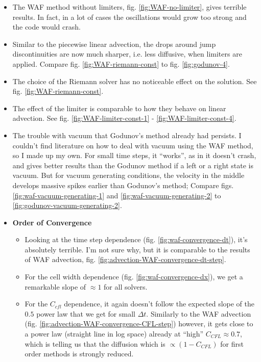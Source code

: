\begin{itemize}

	\item 	The WAF method without limiters, fig. \ref{fig:WAF-no-limiter}, gives terrible results.
			In fact, in a lot of cases the oscillations would grow too strong and the code would crash.

	\item 	Similar to the piecewise linear advection, the drops around jump discontinuities are now much sharper, i.e. less diffusive, when limiters are applied.
			Compare fig. \ref{fig:WAF-riemann-const} to fig. \ref{fig:godunov-4}.

	\item 	The choice of the Riemann solver has no noticeable effect on the solution. 
			See fig. \ref{fig:WAF-riemann-const}.
	
	\item 	The effect of the limiter is comparable to how they behave on linear advection. 
			See fig. \ref{fig:WAF-limiter-const-1} - \ref{fig:WAF-limiter-const-4}.


	\item 	The trouble with vacuum that Godunov's method already had persists.
			I couldn't find literature on how to deal with vacuum using the WAF method, so I made up my own.
			For small time steps, it ``works'', as in it doesn't crash, and gives better results than the Godunov method if a left or a right state is vacuum.
			But for vacuum generating conditions, the velocity in the middle develops massive spikes earlier than Godunov's method;
			Compare figs. \ref{fig:waf-vacuum-generating-1} and \ref{fig:waf-vacuum-generating-2} to \ref{fig:godunov-vacuum-generating-2}.
			
			

	\item \textbf{Order of Convergence}
	
		\begin{itemize}
			
			\item 	Looking at the time step dependence (fig. \ref{fig:waf-convergence-dt}), it's absolutely terrible.
					I'm not sure why, but it is comparable to the results of WAF advection, fig. \ref{fig:advection-WAF-convergence-dt-step}. 
					
			\item 	For the cell width dependence (fig. \ref{fig:waf-convergence-dx}), we get a remarkable slope of $\approx 1$ for all solvers.

			
			\item 	For the $C_{cfl}$ dependence, it again doesn't follow the expected slope of the $0.5$ power law that we get for small $\Delta t$.
					Similarly to the WAF advection (fig. \ref{fig:advection-WAF-convergence-CFL-step}) however, it gets close to a power law (straight line in log space) already at ``high'' $C_{CFL} \approx 0.7$, which is telling us that the diffusion which is $\propto (1 - C_{CFL})$ for first order methods is strongly reduced.
		\end{itemize}
\end{itemize}